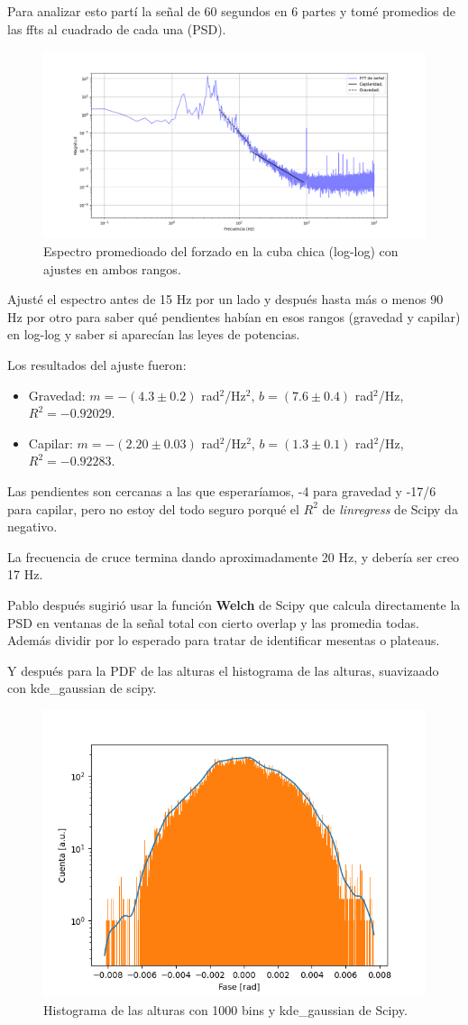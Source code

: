 Para analizar esto partí la señal de 60 segundos en 6 partes y tomé promedios de las ffts al cuadrado de cada una (PSD). 



\begin{figure}[th!]
	\centering
	\includegraphics[width=0.7\linewidth]{Figures/23_06_2025/Espectro_Manu_Lunes}
	\caption{Espectro promedioado del forzado en la cuba chica (log-log) con ajustes en ambos rangos.}
	\label{fig:espectromanulunes}
\end{figure}

Ajusté el espectro antes de 15 Hz por un lado y después hasta más o menos 90 Hz por otro para saber qué pendientes habían en esos rangos (gravedad y capilar) en log-log y saber si aparecían las leyes de potencias.

Los resultados del ajuste fueron:
\begin{itemize}
	\item Gravedad: $m=-(4.3\pm0.2)$ rad$^2$/Hz$^2$, $b=(7.6\pm0.4)$ rad$^2$/Hz, $R^2=-0.92029$. 
	\item Capilar: $m=-(2.20\pm0.03)$ rad$^2$/Hz$^2$, $b=(1.3\pm0.1)$ rad$^2$/Hz, $R^2=-0.92283$.
\end{itemize}

Las pendientes son cercanas a las que esperaríamos, -4 para gravedad y -17/6 para capilar, pero no estoy del todo seguro porqué el $R^2$ de \textit{linregress} de Scipy da negativo.

La frecuencia de cruce termina dando aproximadamente 20 Hz, y debería ser creo 17 Hz.

Pablo después sugirió usar la función \textbf{Welch} de Scipy que calcula directamente la PSD en ventanas de la señal total con cierto overlap y las promedia todas. Además dividir por lo esperado para tratar de identificar mesentas o plateaus.

Y después para la PDF de las alturas el histograma de las alturas, suavizaado con kde\_gaussian de scipy. %

\begin{figure}[th!]
	\centering
	\includegraphics[width=0.4567\linewidth]{Figures/23_06_2025/PDFs_Manu_Lunes}
	\caption{Histograma de las alturas con 1000 bins y kde\_gaussian de Scipy.}
	\label{fig:pdfsmanulunes}
\end{figure}

